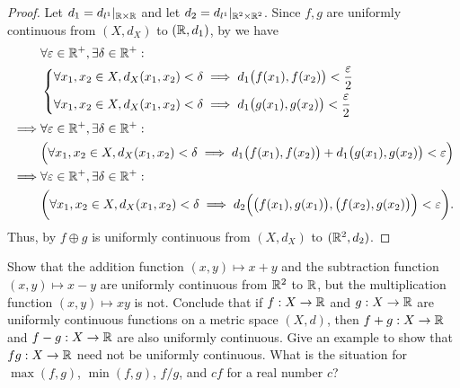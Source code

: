 \begin{proof}
  Let \(d_1 = d_{l^1}|_{\mathbb{R} \times \mathbb{R}}\) and let \(d_2 = d_{l^1}|_{\mathbb{R}^2 \times \mathbb{R}^2}\).
  Since \(f, g\) are uniformly continuous from \((X, d_X)\) to \((\mathbb{R}, d_1)\), by  we have
  \begin{align*}
             & \forall \varepsilon \in \mathbb{R}^+, \exists \delta \in \mathbb{R}^+ :                                                                                            \\
             & \begin{dcases}
                 \forall x_1, x_2 \in X, d_X(x_1, x_2) < \delta \implies d_1\big(f(x_1), f(x_2)\big) < \dfrac{\varepsilon}{2} \\
                 \forall x_1, x_2 \in X, d_X(x_1, x_2) < \delta \implies d_1\big(g(x_1), g(x_2)\big) < \dfrac{\varepsilon}{2}
               \end{dcases}                                       \\
    \implies & \forall \varepsilon \in \mathbb{R}^+, \exists \delta \in \mathbb{R}^+ :                                                                                            \\
             & \Big(\forall x_1, x_2 \in X, d_X(x_1, x_2) < \delta \implies d_1\big(f(x_1), f(x_2)\big) + d_1\big(g(x_1), g(x_2)\big) < \varepsilon\Big)          \\
    \implies & \forall \varepsilon \in \mathbb{R}^+, \exists \delta \in \mathbb{R}^+ :                                                                                            \\
             & \bigg(\forall x_1, x_2 \in X, d_X(x_1, x_2) < \delta \implies d_2\Big(\big(f(x_1), g(x_1)\big), \big(f(x_2), g(x_2)\big)\Big) < \varepsilon\bigg).
  \end{align*}
  Thus, by  \(f \oplus g\) is uniformly continuous from \((X, d_X)\) to \((\mathbb{R}^2, d_2)\).
\end{proof}

\begin{ex}\label{ii:ex:2.3.6}
  Show that the addition function \((x, y) \mapsto x + y\) and the subtraction function \((x, y) \mapsto x - y\) are uniformly continuous from \(\mathbb{R}^2\) to \(\mathbb{R}\), but the multiplication function \((x, y) \mapsto xy\) is not.
  Conclude that if \(f : X \to \mathbb{R}\) and \(g : X \to \mathbb{R}\) are uniformly continuous functions on a metric space \((X, d)\), then \(f + g : X \to \mathbb{R}\) and \(f - g : X \to \mathbb{R}\) are also uniformly continuous.
  Give an example to show that \(fg : X \to \mathbb{R}\) need not be uniformly continuous.
  What is the situation for \(\max(f, g)\), \(\min(f, g)\), \(f / g\), and \(cf\) for a real number \(c\)?
\end{ex}

